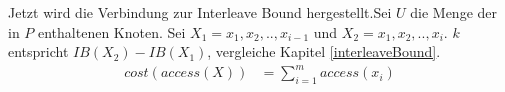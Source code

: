 \documentclass[a4paper,12pt]{article}
\begin{document}
Jetzt wird die Verbindung zur Interleave Bound hergestellt.Sei $U$ die Menge der in $P$ enthaltenen Knoten. Sei $X_1 = x_1, x_2,.., x_{i-1}$ und $X_2 = x_1, x_2,.., x_i$.  $k$ entspricht $\mathit{IB\left(X_2\right)} - \mathit{IB\left(X_1\right)}$, vergleiche Kapitel \ref{interleaveBound}. 
\begin{align*}
\textit{cost}\left(\textit{access}\left(X\right)\right) &= \sum_{i = 1}^{m} \textit{access}\left(x_i\right)\\
\end{align*}



\newpage


\end{document}
